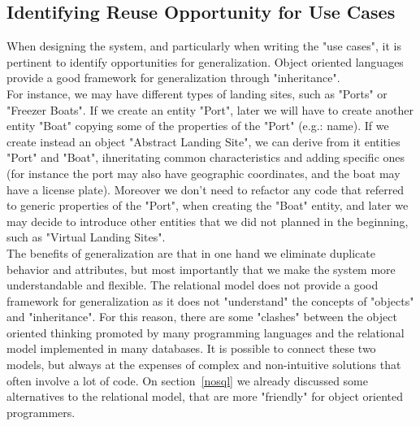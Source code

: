 \documentclass[11pt]{article} %
\begin{document}
\subsection{Identifying Reuse Opportunity for Use Cases}\label{reuse}
When designing the system, and particularly when writing the "use cases", it is pertinent to identify opportunities for generalization. Object oriented languages provide a good framework for generalization through "inheritance".\\
For instance, we may have different types of landing sites, such as "Ports" or "Freezer Boats". If we create an entity "Port", later we will have to create another entity "Boat" copying some of the properties of the "Port" (e.g.: name). If we create instead an object "Abstract Landing Site", we can derive from it entities "Port" and "Boat", ihneritating common characteristics and adding specific ones (for instance the port may also have geographic coordinates, and the boat may have a license plate). Moreover we don't need to refactor any code that referred to generic properties of the "Port", when creating the "Boat" entity, and later we may decide to introduce other entities that we did not planned in the beginning, such as "Virtual Landing Sites".\\
The benefits of generalization are that in one hand we eliminate duplicate behavior and attributes, but most importantly that we make the system more understandable and flexible. The relational model does not provide a good framework for generalization as it does not "understand" the concepts of "objects" and "inheritance". For this reason, there are some "clashes" between the object oriented thinking promoted by many programming languages and the relational model implemented in many databases. It is possible to connect these two models, but always at the expenses of complex and non-intuitive solutions that often involve a lot of code. On section~\ref{nosql} we already discussed some alternatives to the relational model, that are more "friendly" for object oriented programmers.
\end{document}
